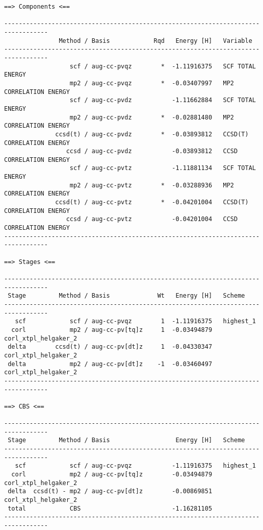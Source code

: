 \begin{verbatim}
==> Components <==

----------------------------------------------------------------------------------
               Method / Basis            Rqd   Energy [H]   Variable
----------------------------------------------------------------------------------
                  scf / aug-cc-pvqz        *  -1.11916375   SCF TOTAL ENERGY
                  mp2 / aug-cc-pvqz        *  -0.03407997   MP2 CORRELATION ENERGY
                  scf / aug-cc-pvdz           -1.11662884   SCF TOTAL ENERGY
                  mp2 / aug-cc-pvdz        *  -0.02881480   MP2 CORRELATION ENERGY
              ccsd(t) / aug-cc-pvdz        *  -0.03893812   CCSD(T) CORRELATION ENERGY
                 ccsd / aug-cc-pvdz           -0.03893812   CCSD CORRELATION ENERGY
                  scf / aug-cc-pvtz           -1.11881134   SCF TOTAL ENERGY
                  mp2 / aug-cc-pvtz        *  -0.03288936   MP2 CORRELATION ENERGY
              ccsd(t) / aug-cc-pvtz        *  -0.04201004   CCSD(T) CORRELATION ENERGY
                 ccsd / aug-cc-pvtz           -0.04201004   CCSD CORRELATION ENERGY
----------------------------------------------------------------------------------

==> Stages <==

----------------------------------------------------------------------------------
 Stage         Method / Basis             Wt   Energy [H]   Scheme
----------------------------------------------------------------------------------
   scf            scf / aug-cc-pvqz        1  -1.11916375   highest_1
  corl            mp2 / aug-cc-pv[tq]z     1  -0.03494879   corl_xtpl_helgaker_2
 delta        ccsd(t) / aug-cc-pv[dt]z     1  -0.04330347   corl_xtpl_helgaker_2
 delta            mp2 / aug-cc-pv[dt]z    -1  -0.03460497   corl_xtpl_helgaker_2
----------------------------------------------------------------------------------

==> CBS <==

----------------------------------------------------------------------------------
 Stage         Method / Basis                  Energy [H]   Scheme
----------------------------------------------------------------------------------
   scf            scf / aug-cc-pvqz           -1.11916375   highest_1
  corl            mp2 / aug-cc-pv[tq]z        -0.03494879   corl_xtpl_helgaker_2
 delta  ccsd(t) - mp2 / aug-cc-pv[dt]z        -0.00869851   corl_xtpl_helgaker_2
 total            CBS                         -1.16281105
----------------------------------------------------------------------------------
\end{verbatim}

